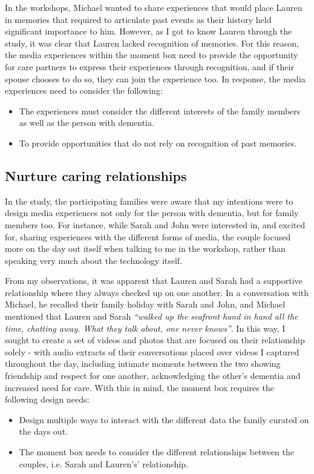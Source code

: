 In the workshops, Michael wanted to share experiences that would place Lauren in memories that required to articulate past events as their history held significant importance to him. However, as I got to know Lauren through the study, it was clear that Lauren lacked recognition of memories. For this reason, the media experiences within the moment box need to provide the opportunity for care partners to express their experiences through recognition, and if their spouse chooses to do so, they can join the experience too. In response, the media experiences need to consider the following:
\begin{itemize}
    \item The experiences must consider the different interests of the family members as well as the person with dementia. 
    \item To provide opportunities that do not rely on recognition of past memories.
\end{itemize}

\subsection{Nurture caring relationships}
\label{CaringRelationships}
In the study, the participating families were aware that my intentions were to design media experiences not only for the person with dementia, but for family members too. For instance, while Sarah and John were interested in, and excited for, sharing experiences with the different forms of media, the couple focused more on the day out itself when talking to me in the workshop, rather than speaking very much about the technology itself.

From my observations, it was apparent that Lauren and Sarah had a supportive relationship where they always checked up on one another. In a conversation with Michael, he recalled their family holiday with Sarah and John, and Michael mentioned that Lauren and Sarah \textit{``walked up the seafront hand in hand all the time, chatting away. What they talk about, one never knows''}. In this way, I sought to create a set of videos and photos that are focused on their relationship solely - with audio extracts of their conversations placed over videos I captured throughout the day, including intimate moments between the two showing friendship and respect for one another, acknowledging the other's dementia and increased need for care. With this in mind, the moment box requires the following design needs:

\begin{itemize}
    \item Design multiple ways to interact with the different data the family curated on the days out.
    \item The moment box needs to consider the different relationships between the couples, i.e. Sarah and Lauren's' relationship.
\end{itemize}


